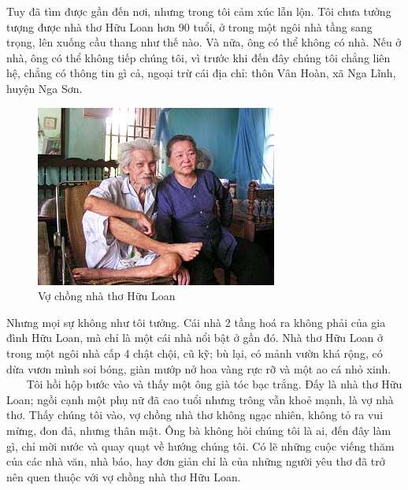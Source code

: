 \documentclass[../main.tex]{subfiles}
\begin{document}
\begin{multicols}{2}
 Tuy đã tìm được gần đến nơi, nhưng trong tôi cảm xúc lẫn lộn. Tôi chưa tưởng tượng được nhà thơ Hữu Loan hơn 90 tuổi, ở trong một ngôi nhà tầng sang trọng, lên xuống cầu thang như thế nào. Và nữa, ông có thể không có nhà. Nếu ở nhà, ông có thể không tiếp chúng tôi, vì trước khi đến đây chúng tôi chẳng liên hệ, chẳng có thông tin gì cả, ngoại trừ cái địa chỉ: thôn Vân Hoàn, xã Nga Lĩnh, huyện Nga Sơn. 
    
 \begin{figure}
	\centering
	\includegraphics[width=\textwidth]{../img/tho180908_1.jpg}
	\caption{Vợ chồng nhà thơ Hữu Loan }
\end{figure}
 Nhưng mọi sự không như tôi tưởng. Cái nhà 2 tầng hoá ra không phải của gia đình Hữu Loan, mà chỉ là một cái nhà nổi bật ở gần đó. Nhà thơ Hữu Loan ở trong một ngôi nhà cấp 4 chật chội, cũ kỹ; bù lại, có mảnh vườn khá rộng, có dừa vươn mình soi bóng, giàn mướp nở hoa vàng rực rỡ và một ao cá nhỏ xinh.  
     
 Tôi hồi hộp bước vào và thấy một ông già tóc bạc trắng. Đấy là nhà thơ Hữu Loan; ngồi cạnh một phụ nữ đã cao tuổi nhưng trông vẫn khoẻ mạnh, là vợ nhà thơ. Thấy chúng tôi vào, vợ chồng nhà thơ không ngạc nhiên, không tỏ ra vui mừng, đon đả, nhưng thân mật. Ông bà không hỏi chúng tôi là ai, đến đây làm gì, chỉ mời nước và quay quạt về hướng chúng tôi. Có lẽ những cuộc viếng thăm của các nhà văn, nhà báo, hay đơn giản chỉ là của những người yêu thơ đã trở nên quen thuộc với vợ chồng nhà thơ Hữu Loan. 
  
 

\end{multicols}
\end{document}

